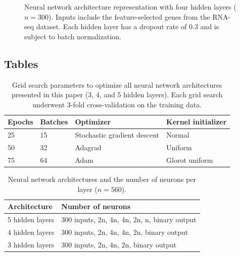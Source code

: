 \documentclass[10pt, letterpaper]{article}
\begin{document}
\begin{figure}[!ht]
    \caption{Neural network architecture representation with four hidden layers ($n=300$). Inputs include the feature-selected genes from the RNA-seq dataset. Each hidden layer has a dropout rate of 0.3 and is subject to batch normalization.}
    \label{fig:neural_vis}
\end{figure}


\subsection*{Tables}
\begin{table}[!ht]
    \caption{Grid search parameters to optimize all neural network architectures presented in this paper (3, 4, and 5 hidden layers). Each grid search underwent 3-fold cross-validation on the training data.}
    \centering
    \label{tab:params}
    \begin{tabular}{l l l l}
        \toprule
        Epochs & Batches & Optimizer & Kernel initializer \\
        \midrule
        25 & 15 & Stochastic gradient descent & Normal \\
        50 & 32 & Adagrad & Uniform \\
        75 & 64 & Adam & Glorot uniform \\
        \bottomrule
    \end{tabular}
\end{table}


\begin{table}[!ht]
	\caption{Neural network architectures and the number of neurons per layer ($n=560$).}	\label{tab:params}
	\centering
	\begin{tabular}{l l}
		\toprule
		Architecture & Number of neurons \\
		\midrule
		 5 hidden layers & 300 inputs, 2n, 4n, 4n, 2n, n, binary output \\
		 4  hidden layers & 300 inputs, 2n, 4n, 4n, 2n, binary output \\
		 3 hidden layers & 300 inputs, 2n, 4n, 2n, binary output \\
		\bottomrule
	\end{tabular}
\end{table}
\end{document}
